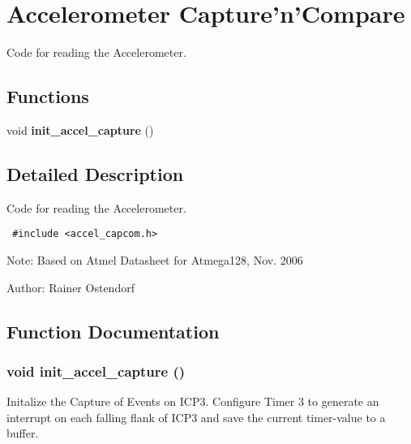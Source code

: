 \section{Accelerometer Capture'n'Compare}
\label{group__ro__accel__capcom}
Code for reading the Accelerometer.  
\subsection*{Functions}
\begin{CompactItemize}
\item 
void {\bf init\_\-accel\_\-capture} ()
\end{CompactItemize}


\subsection{Detailed Description}
Code for reading the Accelerometer. 



\begin{Code}\begin{verbatim} #include <accel_capcom.h> 
\end{verbatim}\end{Code}



\begin{Desc}
\item[Note:]Based on Atmel Datasheet for Atmega128, Nov. 2006 \end{Desc}
\begin{Desc}
\item[Author:]Rainer Ostendorf \end{Desc}


\subsection{Function Documentation}
\subsubsection{\setlength{\rightskip}{0pt plus 5cm}void init\_\-accel\_\-capture ()}\label{group__ro__accel__capcom_g28ee0768f78e74c59ad6fd22ac86cab6}


Initalize the Capture of Events on ICP3. Configure Timer 3 to generate an interrupt on each falling flank of ICP3 and save the current timer-value to a buffer. 

